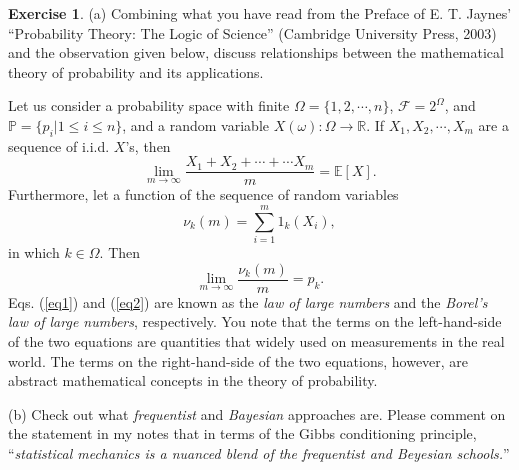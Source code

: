 \documentclass[12pt]{article}
\theoremstyle{definition}
\newtheorem{exer}{Exercise}
\theoremstyle{remark}
\begin{document}
\begin{exer}
    (a) Combining what you have read from the Preface of 
E. T. Jaynes' ``Probability Theory: The Logic of Science'' (Cambridge University Press, 2003) and the observation given below, discuss relationships between the mathematical theory of probability and its applications.
	
	Let us consider a probability space with finite $\Omega=\{1,2,\cdots,n\}$, $\mathcal{F}=2^{\Omega}$, and $\mathbb{P}=\{p_i|1\le i\le n\}$, and a random variable $X(\omega): \Omega\to\mathbb{R}$.
If $X_1,X_2,\cdots,X_m$ are a sequence of i.i.d. $X$'s, then
\begin{equation}
	  \lim_{m\to\infty} \frac{X_1+X_2+\cdots+\cdots X_m}{m}
     = \mathbb{E}[X].
\label{eq1}
\end{equation}
Furthermore, let a function of the sequence of random variables
\[
          \nu_k(m) = \sum_{i=1}^m 1_{k}(X_i), 
\]
in which $k\in\Omega$.  Then
\begin{equation}
   \lim_{m\to\infty} \frac{\nu_k(m)}{m} = p_k.
\label{eq2}
\end{equation}
Eqs. (\ref{eq1}) and (\ref{eq2}) are known as the {\em law of large numbers} and the {\em Borel's law of large numbers}, respectively.
You note that the terms on the left-hand-side of the two equations are quantities that widely used on measurements in the real world. The terms on the right-hand-side of the two equations, however, are
abstract mathematical concepts in the theory of probability. 

(b)  Check out what {\em frequentist} and {\em Bayesian} approaches are.  Please comment on the statement in my notes 
that in terms of the Gibbs conditioning principle, ``{\em statistical mechanics is a nuanced blend of the frequentist and Beyesian schools.}''
\end{exer}
\end{document}
